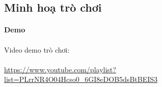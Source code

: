 \subsection{Minh hoạ trò chơi}

\paragraph{Demo}
\paragraph{}{Video demo trò chơi:}
\paragraph{}{\href{https://www.youtube.com/playlist?list=PLrrNR4O04Hcso0\_6GI8eDOB5dsBtBEIS3}{https://www.youtube.com/playlist?list=PLrrNR4O04Hcso0\_6GI8eDOB5dsBtBEIS3} }

